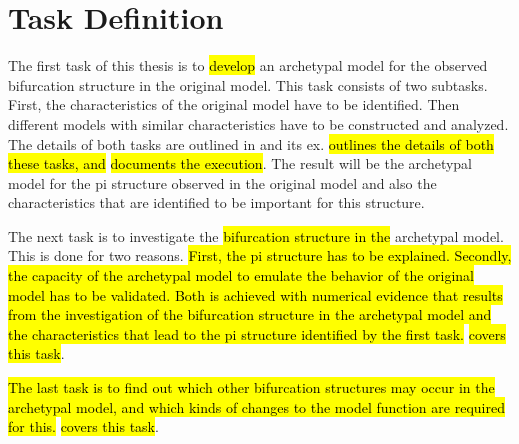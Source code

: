 \chapter{Task Definition}
\label{chap:task}

The first task of this thesis is to \hl{develop} an archetypal model for the observed bifurcation structure in the original model.
This task consists of two subtasks.
First, the characteristics of the original model have to be identified.
Then different models with similar characteristics have to be constructed and analyzed.
The details of both tasks are outlined in  and its ex.
 \hl{outlines the details of both these tasks, and}  \hl{documents the execution}.
The result will be the archetypal model for the \gls{pi} structure observed in the original model and also the characteristics that are identified to be important for this structure.

The next task is to investigate the \hl{bifurcation structure in the} archetypal model.
This is done for two reasons.
\hl{
	First, the \gls{pi} structure has to be explained.
	Secondly, the capacity of the archetypal model to emulate the behavior of the original model has to be validated.
	Both is achieved with numerical evidence that results from the investigation of the bifurcation structure in the archetypal model and the characteristics that lead to the \gls{pi} structure identified by the first task.
}
 \hl{covers this task}.

\hl{
	The last task is to find out which other bifurcation structures may occur in the archetypal model, and which kinds of changes to the model function are required for this.
}
 \hl{covers this task}.
